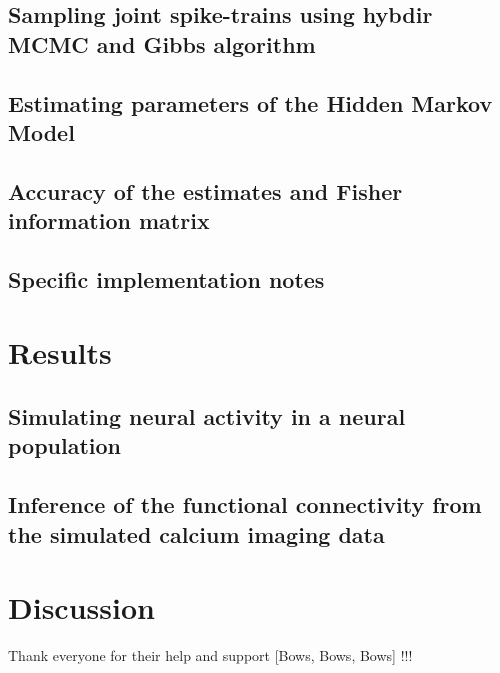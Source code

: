 \documentclass[amsmath, amssymb]{revtex4}
\begin{document}
\subsection{Sampling joint spike-trains using hybdir MCMC and Gibbs algorithm}
\label{sec:methods:sampling HMM}


\subsection{Estimating parameters of the Hidden Markov Model}
\label{sec:methods:parameters HMM}


\subsection{Accuracy of the estimates and Fisher information matrix}
\label{sec:methods:accuracy_Fisher}


\subsection{Specific implementation notes}
\label{sec:methods:specific_implementation}


\section{Results}
\label{results}

\subsection{Simulating neural activity in a neural population}
\label{sec:results:simulations}


\subsection{Inference of the functional connectivity from the simulated calcium imaging data}
\label{sec:results:inference}

\section{Discussion}
\label{discussion}


\begin{acknowledgments}
Thank everyone for their help and support [Bows, Bows, Bows] !!!
\end{acknowledgments}



\end{document}
